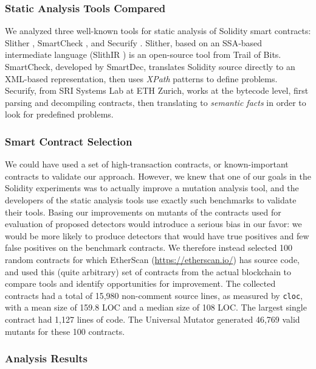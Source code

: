 \subsubsection{Static Analysis Tools Compared}

We analyzed three well-known tools for static analysis of Solidity smart contracts: Slither \cite{slither}, SmartCheck \cite{smartcheck}, and Securify \cite{Securify}.  Slither, based on an SSA-based intermediate language (SlithIR \cite{slither}) is an open-source tool from Trail of Bits.  SmartCheck, developed by SmartDec, translates Solidity source directly to an XML-based representation, then uses \emph{XPath} patterns to define problems.  Securify, from SRI Systems Lab at ETH Zurich, works at the bytecode level, first parsing and decompiling contracts, then translating to \emph{semantic facts} in order to look for predefined problems.

\subsubsection{Smart Contract Selection}

We could have used a set of high-transaction contracts, or known-important contracts to validate our approach.  However, we knew that one of our goals in the Solidity experiments was to actually improve a mutation analysis tool, and the developers of the static analysis tools use exactly such benchmarks to validate their tools.  Basing our improvements on mutants of the contracts used for evaluation of proposed detectors would introduce a serious bias in our favor: we would be more likely to produce detectors that would have true positives and few false positives on the benchmark contracts.  We therefore instead selected 100 random contracts for which EtherScan (\url{https://etherscan.io/}) has source code, and used this (quite arbitrary) set of contracts from the actual blockchain to compare tools and identify opportunities for improvement.  The collected contracts had a total of 15,980 non-comment source lines, as measured by {\tt cloc}, with a mean size of 159.8 LOC and a median size of 108 LOC.  The largest single contract had 1,127 lines of code.  The Universal Mutator generated 46,769 valid mutants for these 100 contracts.

\subsubsection{Analysis Results}

